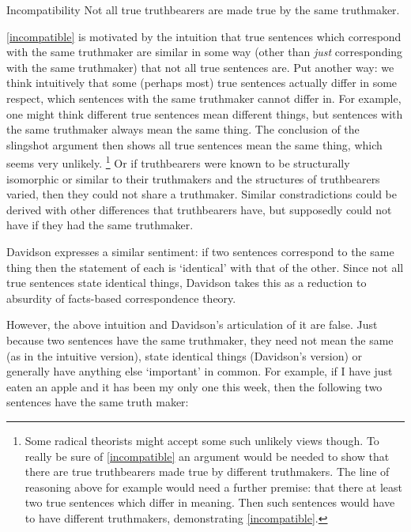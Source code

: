 	\begin{principle}{Incompatibility}\label{incompatible}
	Not all true truthbearers are made true by the same truthmaker.
	\end{principle}

\ref{incompatible} is motivated by the intuition that true sentences which correspond with the same truthmaker are similar in some way (other than \emph{just} corresponding with the same truthmaker) that not all true sentences are.
Put another way: we think intuitively that some (perhaps most) true sentences actually differ in some respect, which sentences with the same truthmaker cannot differ in.
For example, one might think different true sentences mean different things, but sentences with the same truthmaker always mean the same thing.
The conclusion of the slingshot argument then shows all true sentences mean the same thing, which seems very unlikely.
\footnote{
Some radical theorists might accept some such unlikely views though.
To really be sure of \ref{incompatible} an argument would be needed to show that there are true truthbearers made true by different truthmakers.
The line of reasoning above for example would need a further premise: that there at least two true sentences which differ in meaning.
Then such sentences would have to have different truthmakers, demonstrating \ref{incompatible}.
}
Or if truthbearers were known to be structurally isomorphic or similar to their truthmakers and the structures of truthbearers varied, then they could not share a truthmaker.
Similar constradictions could be derived with other differences that truthbearers have, but supposedly could not have if they had the same truthmaker.

Davidson expresses a similar sentiment: if two sentences correspond to the same thing then the statement of each is `identical' with that of the other.
Since not all true sentences state identical things, Davidson takes this as a reduction to absurdity of facts-based correspondence theory.
\parencite[750]{Davidson_1969}

However, the above intuition and Davidson's articulation of it are false.
Just because two sentences have the same truthmaker, they need not mean the same (as in the intuitive version), state identical things (Davidson's version) or generally have anything else `important' in common.
For example, if I have just eaten an apple and it has been my only one this week, then the following two sentences have the same truth maker:

